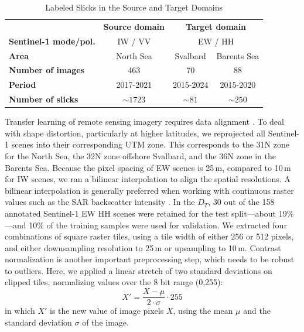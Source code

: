 \documentclass[lettersize,journal]{IEEEtran}
\begin{document}
\begin{table}[!t]
    \caption{Labeled Slicks in the Source and Target Domains}
    \label{table1}
    \centering
    \begin{tabular}{lcc|cc}
        \toprule
        & \multicolumn{2}{c}{\textbf{Source domain}} & \multicolumn{2}{c}{\textbf{Target domain}} \\
        \cmidrule(lr){2-3} \cmidrule(lr){4-5}
        \textbf{Sentinel-1 mode/pol.} & \multicolumn{2}{c}{IW / VV} & \multicolumn{2}{c}{EW / HH} \\
        \midrule
        \textbf{Area} & \multicolumn{2}{c}{North Sea} & Svalbard & Barents Sea \\
        \textbf{Number of images} & \multicolumn{2}{c}{463} & 70 & 88 \\
        \textbf{Period} & \multicolumn{2}{c}{2017-2021} & 2015-2024 & 2015-2020 \\
        \textbf{Number of slicks} & \multicolumn{2}{c}{$\sim 1723$} & $\sim 81$ & $\sim 250$ \\
        \bottomrule
    \end{tabular}
\end{table}

Transfer learning of remote sensing imagery requires data alignment \cite{tuiaDomainAdaptationClassification2016}. To deal with shape distortion, particularly at higher latitudes, we reprojected all Sentinel-1 scenes 
into their corresponding UTM zone. This corresponds to the 31N zone for the North Sea, the 32N zone offshore Svalbard, and the 36N zone in the Barents Sea. Because the pixel spacing of EW scenes is 25\,m, compared to 10\,m 
for IW scenes, we ran a bilinear interpolation to align the spatial resolutions. A bilinear interpolation is generally preferred when working with continuous raster values such as the SAR backscatter intensity 
\cite{schowengerdtRemoteSensingModels2006}. In the $\mathit{D}_T$, 30 out of the 158 annotated Sentinel-1 EW HH scenes were retained for the test split—about 19\%—and 10\% of the training samples were used for validation. 
We extracted four combinations of square raster tiles, using a tile width of either 256 or 512 pixels, and either downsampling resolution to 25\,m or upsampling to 10\,m. Contrast normalization is another important preprocessing step, 
which needs to be robust to outliers\cite{goodfellowDeepLearning2016,schowengerdtRemoteSensingModels2006}. 
Here, we applied a linear stretch of two standard deviations on clipped tiles, normalizing values over the 8 bit range (0,255):
\begin{equation}
    X' = \frac{X - \mu }{2 \cdot \sigma} \cdot 255
\end{equation}
in which \( X' \) is the new value of image pixels \( X \), using the mean \( \mu \) and the standard deviation \( \sigma \) of the image.
\end{document}
